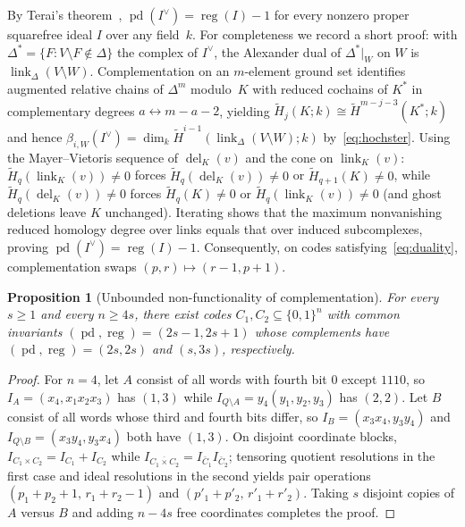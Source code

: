\documentclass[11pt]{article}
\theoremstyle{plain}
\newtheorem{proposition}[theorem]{Proposition}
\theoremstyle{definition}
\theoremstyle{remark}
\DeclareMathOperator{\pd}{pd}
\DeclareMathOperator{\reg}{reg}
\DeclareMathOperator{\link}{link}
\DeclareMathOperator{\del}{del}
\begin{document}
By Terai's theorem~\cite{Terai1999}, $\pd(I^\vee) = \reg(I) - 1$ for every nonzero proper squarefree ideal $I$ over any field~$k$. For completeness we record a short proof: with $\Delta^* = \{F : V\setminus F \notin \Delta\}$ the complex of $I^\vee$, the Alexander dual of $\Delta^*|_W$ on $W$ is $\link_\Delta(V\setminus W)$. Complementation on an $m$-element ground set identifies augmented relative chains of $\Delta^m$ modulo~$K$ with reduced cochains of $K^*$ in complementary degrees $a \leftrightarrow m-a-2$, yielding $\widetilde{H}_j(K;k) \cong \widetilde{H}^{m-j-3}(K^*;k)$ and hence $\beta_{i,W}(I^\vee) = \dim_k \widetilde{H}^{i-1}(\link_\Delta(V\setminus W);k)$ by~\eqref{eq:hochster}. Using the Mayer--Vietoris sequence of $\del_K(v)$ and the cone on $\link_K(v)$: $\widetilde{H}_q(\link_K(v)) \neq 0$ forces $\widetilde{H}_q(\del_K(v)) \neq 0$ or $\widetilde{H}_{q+1}(K) \neq 0$, while $\widetilde{H}_q(\del_K(v)) \neq 0$ forces $\widetilde{H}_q(K) \neq 0$ or $\widetilde{H}_q(\link_K(v)) \neq 0$ (and ghost deletions leave $K$ unchanged). Iterating shows that the maximum nonvanishing reduced homology degree over links equals that over induced subcomplexes, proving $\pd(I^\vee) = \reg(I) - 1$. Consequently, on codes satisfying~\eqref{eq:duality}, complementation swaps $(p,r) \mapsto (r-1, p+1)$.

\begin{proposition}[Unbounded non-functionality of complementation]\label{prop:comp-fail}
For every $s \ge 1$ and every $n \ge 4s$, there exist codes $C_1, C_2 \subseteq \{0,1\}^n$ with common invariants $(\pd,\reg) = (2s-1, 2s+1)$ whose complements have $(\pd,\reg) = (2s, 2s)$ and $(s, 3s)$, respectively.
\end{proposition}

\begin{proof}
For $n = 4$, let $A$ consist of all words with fourth bit $0$ except $1110$, so $I_A = (x_4, x_1 x_2 x_3)$ has $(1,3)$ while $I_{Q\setminus A} = y_4(y_1,y_2,y_3)$ has $(2,2)$. Let $B$ consist of all words whose third and fourth bits differ, so $I_B = (x_3 x_4, y_3 y_4)$ and $I_{Q\setminus B} = (x_3 y_4, y_3 x_4)$ both have $(1,3)$. On disjoint coordinate blocks, $I_{C_1 \times C_2} = I_{C_1} + I_{C_2}$ while $I_{\overline{C_1 \times C_2}} = I_{\bar{C}_1} I_{\bar{C}_2}$; tensoring quotient resolutions in the first case and ideal resolutions in the second yields pair operations $(p_1 + p_2 + 1,\, r_1 + r_2 - 1)$ and $(p'_1 + p'_2,\, r'_1 + r'_2)$. Taking $s$ disjoint copies of $A$ versus $B$ and adding $n-4s$ free coordinates completes the proof.
\end{proof}
\end{document}
